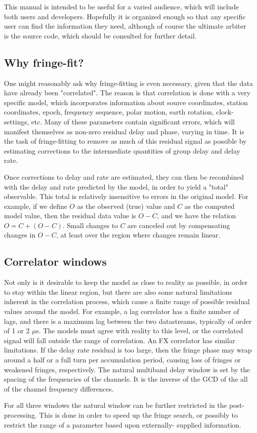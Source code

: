 This manual is intended to be useful for a varied audience, which will
include both users and developers. Hopefully it is organized enough
so that any specific user can find the information they need, although
of course the ultimate arbiter is the source code, which should be
consulted for further detail.

\subsection{Why fringe-fit?}
One might reasonably ask why fringe-fitting is even necessary, given that
the data have already been "correlated". The reason is that correlation
is done with a very specific model, which incorporates information about
source coordinates, station coordinates, epoch, frequency sequence, polar
motion, earth rotation, clock-settings, etc. Many of these parameters
contain significant errors, which will manifest themselves as non-zero
residual delay and phase, varying in time. It is the task of fringe-fitting
to remove as much of this residual signal as possible by estimating corrections
to the intermediate quantities of group delay and delay rate.

Once corrections to delay and rate are estimated, they can then be recombined
with the delay and rate predicted by the model, in order to yield a "total"
observable. This total is relatively insensitive to errors in the original
model. For example, if we define $O$ as the observed (true) value and $C$ 
as the computed model value, then the residual data value is $O-C$, and we 
have the relation $O = C + (O-C)$. Small changes to $C$ are canceled out by
compensating changes in $O-C$, at least over the region where changes
remain linear.

\subsection{Correlator windows}
Not only is it desirable to keep the model as close to reality as possible,
in order to stay within the linear region, but there are also some natural
limitations inherent in the correlation process, which cause a finite range
of possible residual values around the model. For example, a lag correlator
has a finite number of lags, and there is a maximum lag between the two 
datastreams, typically of order of 1 or 2 $\mu$s. The models must agree
with reality to this level, or the correlated signal will fall outside
the range of correlation. An FX correlator has similar limitations. If the
delay rate residual is too large, then the fringe phase may wrap around
a half or a full turn per accumulation period, causing loss of fringes or
weakened fringes, respectively. The natural multiband delay window is set 
by the spacing of the frequencies of the channels. It is the inverse of the
GCD of the all of the channel frequency differences.

For all three windows the natural window can be further restricted in
the post-processing. This is done in order to speed up the fringe search,
or possibly to restrict the range of a parameter based upon externally-
supplied information.
